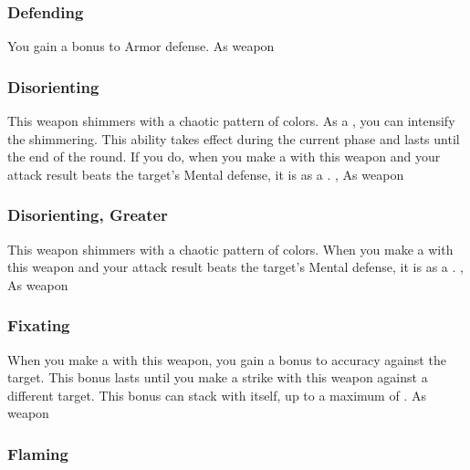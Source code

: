 \lowercase{\hypertarget{item:Defending}{}}\label{item:Defending}
\hypertarget{item:Defending}{\subsubsection{Defending\hfill{}}}
You gain a  bonus to Armor defense.
 
 As weapon
\lowercase{\hypertarget{item:Disorienting}{}}\label{item:Disorienting}
\hypertarget{item:Disorienting}{\subsubsection{Disorienting\hfill{}}}
This weapon shimmers with a chaotic pattern of colors.
As a , you can intensify the shimmering.
This ability takes effect during the current phase and lasts until the end of the round.
If you do, when you make a   with this weapon and your attack result beats the target's Mental defense, it is \disoriented as a .
 , 
 As weapon
\lowercase{\hypertarget{item:Disorienting, Greater}{}}\label{item:Disorienting, Greater}
\hypertarget{item:Disorienting, Greater}{\subsubsection{Disorienting, Greater\hfill{}}}
This weapon shimmers with a chaotic pattern of colors.
When you make a  with this weapon and your attack result beats the target's Mental defense, it is \disoriented as a .
 , 
 As weapon
\lowercase{\hypertarget{item:Fixating}{}}\label{item:Fixating}
\hypertarget{item:Fixating}{\subsubsection{Fixating\hfill{}}}
When you make a  with this weapon, you gain a  bonus to accuracy against the target.
This bonus lasts until you make a strike with this weapon against a different target.
This bonus can stack with itself, up to a maximum of .
 
 As weapon
\lowercase{\hypertarget{item:Flaming}{}}\label{item:Flaming}
\hypertarget{item:Flaming}{\subsubsection{Flaming\hfill{}}}
